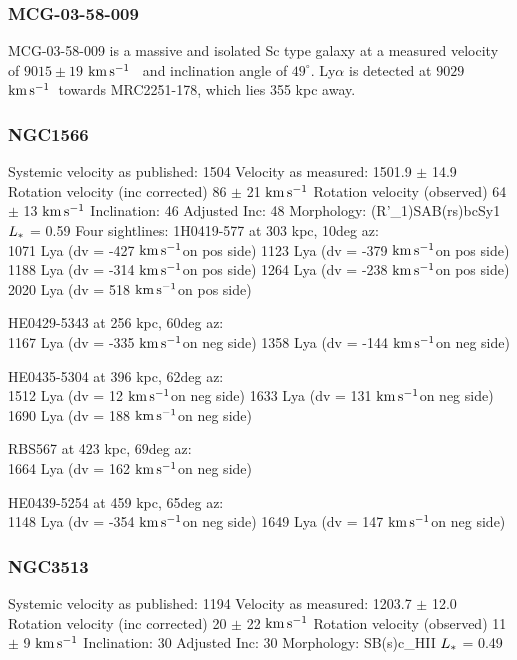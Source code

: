 \documentclass[iop]{emulateapj-rtx4}
\newcommand{\kms}{$\rm km\, s^{-1}$}
\begin{document}
\subsubsection{MCG-03-58-009}
MCG-03-58-009 is a massive and isolated Sc type galaxy at a measured velocity of $9015 \pm 19$ \kms~ and inclination angle of $49^{\circ}$. Ly$\alpha$ is detected at $9029$ \kms~towards MRC2251-178, which lies 355 kpc away.

%



\subsubsection{NGC1566}
Systemic velocity as published: 1504
Velocity as measured: 1501.9 $\pm$ 14.9
Rotation velocity (inc corrected) 86 $\pm$ 21 \kms
Rotation velocity (observed) 64 $\pm$ 13 \kms
Inclination: 46
Adjusted Inc: 48
Morphology: (R'\_1)SAB(rs)bcSy1
$L_{\**}$ = 0.59
Four sightlines: 
1H0419-577 at 303 kpc, 10deg az: \\
1071 Lya (dv = -427 \kms on pos side)
1123 Lya (dv = -379 \kms on pos side)
1188 Lya (dv = -314 \kms on pos side)
1264 Lya (dv = -238 \kms on pos side)
2020 Lya (dv = 518 \kms on pos side)

HE0429-5343 at 256 kpc, 60deg az: \\
1167 Lya (dv = -335 \kms on neg side)
1358 Lya (dv = -144 \kms on neg side)

HE0435-5304 at 396 kpc, 62deg az: \\
1512 Lya (dv = 12 \kms on neg side)
1633 Lya (dv = 131 \kms on neg side)
1690 Lya (dv = 188 \kms on neg side)

RBS567 at 423 kpc, 69deg az: \\
1664 Lya (dv = 162 \kms on neg side)

HE0439-5254 at 459 kpc, 65deg az: \\
1148 Lya (dv = -354 \kms on neg side)
1649 Lya (dv = 147 \kms on neg side)



\subsubsection{NGC3513}
Systemic velocity as published: 1194
Velocity as measured: 1203.7 $\pm$ 12.0
Rotation velocity (inc corrected) 20 $\pm$ 22 \kms
Rotation velocity (observed) 11 $\pm$ 9 \kms
Inclination: 30
Adjusted Inc: 30
Morphology: SB(s)c\_HII
$L_{\**}$ = 0.49 \\
\end{document}
